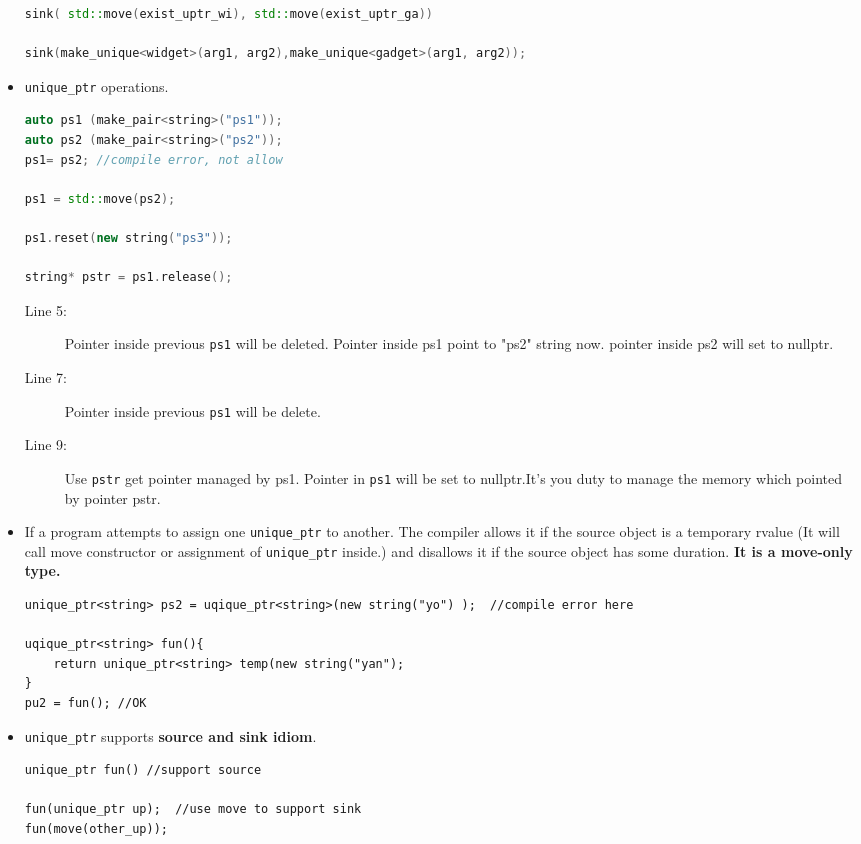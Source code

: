 \documentclass[a4paper,11pt,twoside]{book}
\begin{document}
\begin{itemize}
\begin{lstlisting}[frame=single, language=c++]
sink( std::move(exist_uptr_wi), std::move(exist_uptr_ga))

sink(make_unique<widget>(arg1, arg2),make_unique<gadget>(arg1, arg2));  
\end{lstlisting}


\item \texttt{unique\_ptr} operations.
\begin{lstlisting}[frame=single, language=c++]
auto ps1 (make_pair<string>("ps1"));
auto ps2 (make_pair<string>("ps2"));
ps1= ps2; //compile error, not allow

ps1 = std::move(ps2);

ps1.reset(new string("ps3"));

string* pstr = ps1.release();
\end{lstlisting}
\begin{description}
	\item[Line 5:]  Pointer inside previous \texttt{ps1} will be deleted. Pointer inside ps1 point to "ps2" string now. pointer inside ps2 will set to nullptr.
	\item[Line 7:]  Pointer inside previous \texttt{ps1} will be delete.
	
	\item[Line 9:] Use \texttt{pstr} get pointer managed by ps1. Pointer in \texttt{ps1} will be set to nullptr.It's you duty to manage the memory which pointed by pointer pstr.
\end{description} 

\item If a program attempts to assign one \texttt{unique\_ptr} to another. The compiler allows it if the source object is a temporary rvalue (It will call move constructor or assignment of \texttt{unique\_ptr} inside.) and disallows it if the source object has some duration. \textbf{It is a move-only type.}
\begin{lstlisting}[numbers=none]
unique_ptr<string> ps2 = uqique_ptr<string>(new string("yo") );  //compile error here

uqique_ptr<string> fun(){
	return unique_ptr<string> temp(new string("yan");
}
pu2 = fun(); //OK
\end{lstlisting}

\item \texttt{unique\_ptr} supports \textbf{source and sink idiom}.
\begin{lstlisting}[numbers=none]
unique_ptr fun() //support source

fun(unique_ptr up);  //use move to support sink
fun(move(other_up));
\end{lstlisting}


\end{itemize}
\end{document}
